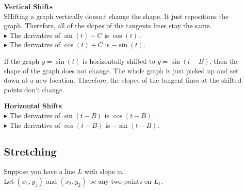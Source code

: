\documentclass{ximera}
\begin{document}
\begin{observation} \textbf{\textcolor{purple!85!blue}{Vertical Shifts}}  \\

SHifting a graph vertically doesn;t change the shape.  It just repositions the graph.  Therefore, all of the slopes of the tangents lines stay the same. \\



$\blacktriangleright$ The derivative of $\sin(t)+C$ is $\cos(t)$. \\

$\blacktriangleright$ The derivative of $\cos(t)+C$ is $-\sin(t)$. \\

\end{observation}




If the graph $y = \sin(t)$ is horizontally shifted to $y = \sin(t - B)$, then the shape of the graph does not change. The whole graph is just picked up and set down at a new location. Therefore, the slopes of the tangent lines at the shifted points don't change.



\begin{observation} \textbf{\textcolor{purple!85!blue}{Horizontal Shifts}} \\

$\blacktriangleright$ The derivative of $\sin(t - B)$ is $\cos(t - B)$. \\

$\blacktriangleright$ The derivative of $\cos(t - B)$ is $-\sin(t - B)$. \\

\end{observation}















\subsection{Stretching}


Suppose you have a line $L$ with slope $m$. \\

Let $(x_1, y_1)$ and $(x_2, y_2)$ be any two points on $L_1$. \\
\end{document}
